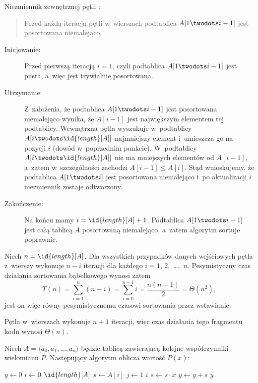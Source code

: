 \subproblem %
Niezmiennik zewnętrznej pętli :
\begin{quote}
Przed każdą iteracją pętli  w~wierszach  podtablica $A[1\twodots i-1]$ jest posortowana niemalejąco.
\end{quote}
\begin{description}
	\item[Inicjowanie:] Przed pierwszą iteracją $i=1$, czyli podtablica $A[1\twodots i-1]$ jest pusta, a~więc jest trywialnie posortowana.
	\item[Utrzymanie:] Z~założenia, że podtablica $A[1\twodots i-1]$ jest posortowana niemalejąco wynika, że $A[i-1]$ jest największym elementem tej podtablicy. Wewnętrzna pętla  wyszukuje w~podtablicy $A[i\twodots\id{length}[A]]$ najmniejszy element i~umieszcza go na pozycji $i$ (dowód w~poprzednim punkcie). W~podtablicy $A[i\twodots\id{length}[A]]$ nie ma mniejszych elementów od $A[i-1]$, a~zatem w~szczególności zachodzi $A[i-1]\le A[i]$. Stąd wnioskujemy, że podtablica $A[1\twodots i]$ jest posortowana niemalejąco i~po aktualizacji $i$ niezmiennik zostaje odtworzony.
	\item[Zakończenie:] Na końcu mamy $i=\id{length}[A]+1$. Podtablica $A[1\twodots i-1]$ jest całą tablicą $A$ posortowaną niemalejąco, a~zatem algorytm sortuje poprawnie.
\end{description}

\subproblem %
Niech $n=\id{length}[A]$. Dla wszystkich przypadków danych wejściowych pętla  z~wierszy  wykonuje $n-i$ iteracji dla każdego $i=1$, 2,~\dots,~$n$. Pesymistyczny czas działania sortowania bąbelkowego wynosi zatem
\[
	T(n) = \sum_{i=1}^n(n-i) = \sum_{i=0}^{n-1}i = \frac{n(n-1)}{2} = \Theta(n^2),
\]
jest on więc równy pesymistycznemu czasowi sortowania przez wstawianie.


\subproblem %
Pętla  w~wierszach  wykonuje $n+1$ iteracji, więc czas działania tego fragmentu kodu wynosi $\Theta(n)$.

\subproblem %
Niech $A=\langle a_0,a_1,\dots,a_n\rangle$ będzie tablicą zawierającą kolejne współczynniki wielomianu $P$. Następujący algorytm oblicza wartość $P(x)$:
\begin{codebox}
\li	$y\gets0$
\li	\For $i\gets0$ \To $\id{length}[A]$
\li		\Do
			$s\gets A[i]$
\li			\For $j\gets1$ \To $i$ \label{li:naive-polynomial-evaluation-for-begin}
\li				\Do $s\gets s\cdot x$
				\End \label{li:naive-polynomial-evaluation-for-end}
\li			$y\gets y+s$
		\End
\li	\Return $y$
\end{codebox}

